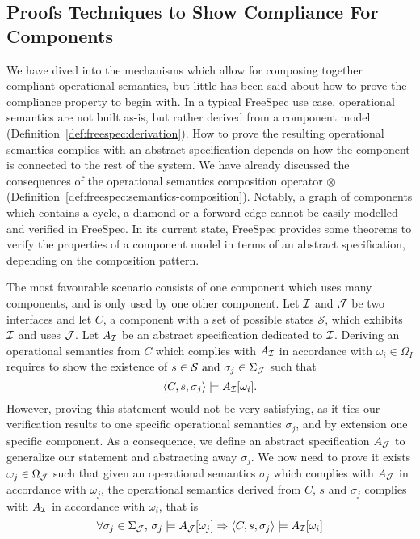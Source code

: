 \subsection{Proofs Techniques to Show Compliance For Components}

We have dived into the mechanisms which allow for composing together compliant
operational semantics, but little has been said about how to prove the
compliance property to begin with.
%
In a typical FreeSpec use case, operational semantics are not built as-is, but
rather derived from a component model
(Definition~\ref{def:freespec:derivation}).
%
How to prove the resulting operational semantics complies with an abstract
specification depends on how the component is connected to the rest of the
system.
%
We have already discussed the consequences of the operational semantics
composition operator $\otimes$
(Definition~\ref{def:freespec:semantics-composition}).
%
Notably, a graph of components which contains a cycle, a diamond or a forward
edge cannot be easily modelled and verified in FreeSpec.
%
In its current state, FreeSpec provides some theorems to verify the properties
of a component model in terms of an abstract specification, depending on the
composition pattern.

The most favourable scenario consists of one component which uses many
components, and is only used by one other component.
%
Let $\mathcal{I}$ and $\mathcal{J}$ be two interfaces and let $C$, a component with a set of
possible states $\mathcal{S}$, which exhibits $\mathcal{I}$ and uses $\mathcal{J}$.
%
Let $A_{\mathcal{I}}$ be an abstract specification dedicated to $\mathcal{I}$.
%
Deriving an operational semantics from $C$ which complies with $A_{\mathcal{I}}$ in
accordance with $\omega_i \in \Omega_I$ requires to show the existence of
$s \in \mathcal{S} \text{ and }\sigma_j \in \Sigma_{\mathcal{J}}$ such that
\[ \langle C, s, \sigma_j \rangle \models A_{\mathcal{I}}[\omega_i]. \]
%
However, proving this statement would not be very satisfying, as it ties our
verification results to one specific operational semantics $\sigma_j$, and by
extension one specific component.
%
As a consequence, we define an abstract specification $A_{\mathcal{J}}$ to generalize our
statement and abstracting away $\sigma_j$.
%
We now need to prove it exists $\omega_j \in \Omega_{\mathcal{J}}$ such that given an
operational semantics $\sigma_j$ which complies with $A_{\mathcal{J}}$ in accordance with
$\omega_j$, the operational semantics derived from $C$, $s$ and $\sigma_j$
complies with $A_{\mathcal{I}}$ in accordance with $\omega_i$, that is
\[ \forall \sigma_j \in \Sigma_{\mathcal{J}}\text{, }\sigma_j \models A_{\mathcal{J}}[\omega_j]
  \Rightarrow \langle C, s, \sigma_j \rangle \models A_{\mathcal{I}}[\omega_i]
\]

